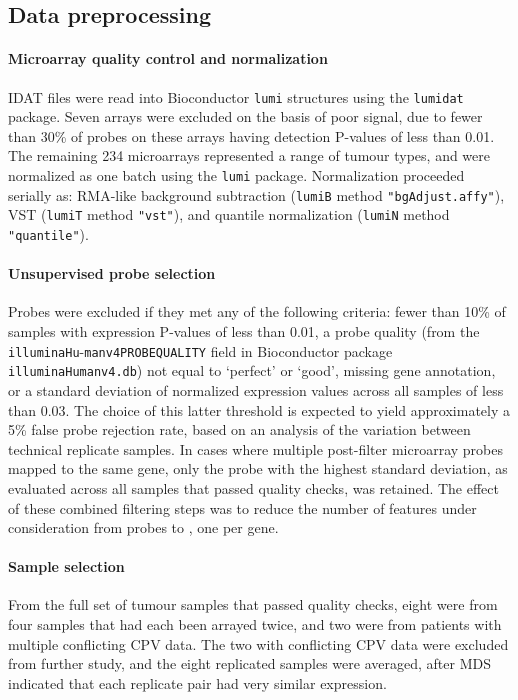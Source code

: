 \documentclass[dissertation.tex]{subfiles}
\begin{document}
\subsection{Data preprocessing}
\paragraph{Microarray quality control and normalization}
\gls{IDAT} files were read into Bioconductor \texttt{lumi} structures using the \texttt{lumidat} package.  Seven arrays were excluded on the basis of poor signal, due to fewer than 30\% of probes on these arrays having detection P-values of less than 0.01.  The remaining 234 microarrays represented a range of tumour types, and were normalized as one batch using the \texttt{lumi} package.  Normalization proceeded serially as: RMA-like background subtraction (\texttt{lumiB} method \texttt{"bgAdjust.affy"}), \gls{VST} (\texttt{lumiT} method \texttt{"vst"}), and quantile normalization (\texttt{lumiN} method \texttt{"quantile"}).

\paragraph{Unsupervised probe selection}
Probes were excluded if they met any of the following criteria: fewer than 10\% of samples with expression P-values of less than 0.01, a probe quality (from the \texttt{illuminaHu}-\texttt{manv4PROBEQUALITY} field in Bioconductor package \texttt{illuminaHumanv4.db}) not equal to `perfect' or `good', missing gene annotation, or a standard deviation of normalized expression values across all samples of less than 0.03.  The choice of this latter threshold is expected to yield approximately a 5\% false probe rejection rate, based on an analysis of the variation between technical replicate samples.  In cases where multiple post-filter microarray probes mapped to the same gene, only the probe with the highest standard deviation, as evaluated across all samples that passed quality checks, was retained.  The effect of these combined filtering steps was to reduce the number of features under consideration from  probes to , one per gene.

\paragraph{Sample selection}  From the full set of  tumour samples that passed quality checks, eight were from four samples that had each been arrayed twice, and two were from patients with multiple conflicting \gls{CPV} data.  The two with conflicting \gls{CPV} data were excluded from further study, and the eight replicated samples were averaged, after \gls{MDS} indicated that each replicate pair had very similar expression.
\end{document}

